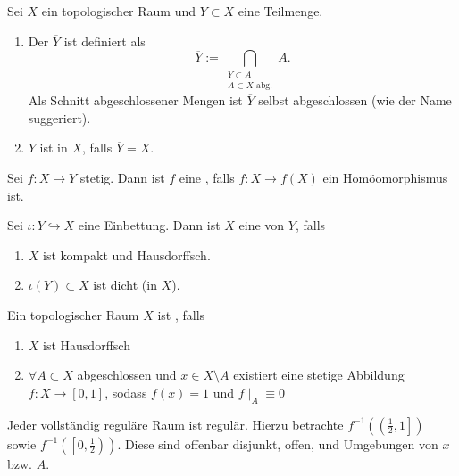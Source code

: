 \begin{definition} \label{def:abschluss-dichtheit}
    Sei $X$ ein topologischer Raum und $Y\subset X$ eine Teilmenge.
    \begin{enumerate}[1)]
        \item Der  $\overline{Y}$ ist definiert als
            \[
            \overline{Y} := \bigcap_{\substack{Y\subset A \\ A\subset X \text{ abg.}} } A
            .\] 
            Als Schnitt abgeschlossener Mengen ist $\overline{Y}$ selbst abgeschlossen (wie der Name suggeriert).
        \item  $Y$ ist  in $X$, falls  $\overline{Y} = X$.
    \end{enumerate}
\end{definition}
\begin{definition}[Einbettung]\label{def:einbettung}
    Sei $f:X\to Y$ stetig. Dann ist $f$ eine  , falls $f: X \to  f(X)$ ein Homöomorphismus ist.
\end{definition}
\begin{definition}[Kompaktifizierung] \label{def:kompaktifizierung}
    Sei $ι: Y\hookrightarrow X$ eine Einbettung. Dann ist $X$ eine  von $Y$, falls
    \begin{enumerate}[1)]
        \item $X$ ist kompakt und Hausdorffsch.
        \item  $ι(Y)\subset X$ ist dicht (in $X$).
    \end{enumerate}
\end{definition}
\begin{definition}\label{def:vollständig-regulär}
    Ein topologischer Raum $X$ ist  , falls
    \begin{enumerate}[1)]
        \item $X$ ist Hausdorffsch
        \item  $\forall A\subset X$ abgeschlossen und $x\in X\setminus A$ existiert eine stetige Abbildung $f:X \to  [0,1]$, sodass $f(x) = 1$ und  $f\mid _A \equiv 0$
    \end{enumerate}
\end{definition}
\begin{remark}
    Jeder vollständig reguläre Raum ist regulär. Hierzu betrachte $f^{-1}\left( \left( \frac{1}{2},1 \right]  \right) $ sowie $f^{-1}\left( \left[ 0,\frac{1}{2}  \right)  \right) $. Diese sind offenbar disjunkt, offen, und Umgebungen von $x$ bzw.  $A$.
\end{remark}

